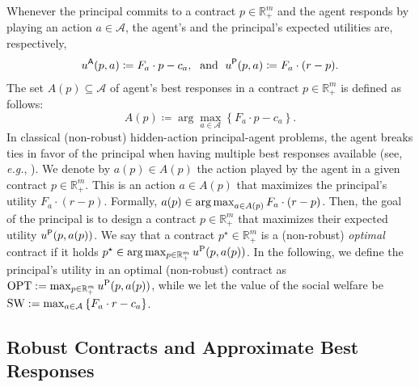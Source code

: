 %
Whenever the principal commits to a contract $p \in \mathbb{R}^{m}_{+}$ and the agent responds by playing an action $a \in \mathcal{A}$,
the agent's and the principal's expected utilities are, respectively,
\begin{align*}
	u^{\mathsf{A}}(p,a)\coloneqq F_{a} \cdot p - c_a, 
	\;\text{ and }\;
	u^{\mathsf{P}}(p,a)\coloneqq F_{a} \cdot (r-p).
\end{align*}
%
%
The set $A(p) \subseteq \mathcal{A}$ of agent's best responses in a contract $p \in \mathbb{R}^{m}_{+}$ is defined as follows:
%
\begin{equation*}%
	A(p) \coloneqq \arg\max_{a \in \mathcal{A}} \left \{ F_a \cdot p - c_a \right\}.
\end{equation*}
%
In classical (non-robust) hidden-action principal-agent problems, the agent breaks ties in favor of the principal when having multiple best responses available (see, \emph{e.g.}, \citep{dutting2019simple}).
%
We denote by $a(p) \in A(p)$ the action played by the agent in a given contract $p \in \mathbb{R}^{m}_{+}$.
%
This is an action $a \in A(p)$ that maximizes the principal's utility $F_{a} \cdot \left( r - p \right)$.
%
Formally, $a(p) \in \operatorname*{arg\,max}_{a \in A(p)} F_{a} \cdot \left( r - p \right) $.
%
%
Then, the goal of the principal is to design a contract $p \in \mathbb{R}^{m}_{+}$ that maximizes their expected utility $u^{\mathsf{P}}(p,a(p))$.
%
We say that a contract $p^\star \in\mathbb{R}^{m}_{+}$ is a (non-robust) \emph{optimal} contract if it holds $p^\star \in \arg\max_{p \in \mathbb{R}^{m}_{+}} u^{\textnormal{P}}(p,a(p))$.
%
In the following, we define the principal's utility in an optimal (non-robust) contract as $\textnormal{OPT} := \max_{p \in \mathbb{R}^{m}_{+}} u^{\textnormal{P}}(p, a(p))$, while we let the value of the social welfare be $\textnormal{SW} := \max_{a \in \mathcal{A}} \left\{ F_a \cdot r - c_a \right\}$.
%



\subsection{Robust Contracts and Approximate Best Responses}\label{sec:prelim_model_robust}

